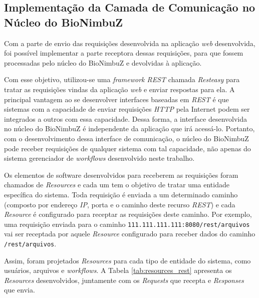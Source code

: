 \subsection{Implementação da Camada de Comunicação no Núcleo do BioNimbuZ} \label{cap5sec5subsec2}

Com a parte de envio das requisições desenvolvida na aplicação \textit{web} desenvolvida, foi possível implementar a parte receptora dessas requisições, para que fossem processadas pelo núcleo do BioNimbuZ e devolvidas à aplicação. 

Com esse objetivo, utilizou-se uma \textit{framework REST} chamada \textit{Resteasy} \cite{resteasy_url} para tratar as requisições vindas da aplicação \textit{web} e enviar respostas para ela. A principal vantagem ao se desenvolver interfaces baseadas em \textit{REST} é que sistemas com a capacidade de enviar requisições \textit{HTTP} pela Internet podem ser integrados a outros com essa capacidade. Dessa forma, a interface desenvolvida no núcleo do BioNimbuZ é independente da aplicação que irá acessá-lo. Portanto, com o desenvolvimento dessa interface de comunicação, o núcleo do BioNimbuZ pode receber requisições de qualquer sistema com tal capacidade, não apenas do sistema gerenciador de \textit{workflows} desenvolvido neste trabalho.

Os elementos de software desenvolvidos para receberem as requisições foram chamados de \textit{Resources} e cada um tem o objetivo de tratar uma entidade específica do sistema. Toda requisição é enviada a um determinado caminho (composto por endereço \textit{IP}, porta e o caminho deste recurso \textit{REST}) e cada \textit{Resource} é configurado para receptar as requisições deste caminho. Por exemplo, uma requisição enviada para o caminho \texttt{111.111.111.111:8080/rest/arquivos} vai ser receptada por aquele \textit{Resource} configurado para receber dados do caminho \texttt{/rest/arquivos}.

Assim, foram projetados \textit{Resources} para cada tipo de entidade do sistema, como usuários, arquivos e \textit{workflows}. A Tabela \ref{tab:resources_rest} apresenta os \textit{Resources} desenvolvidos, juntamente com os \textit{Requests} que recepta e \textit{Responses} que envia.

